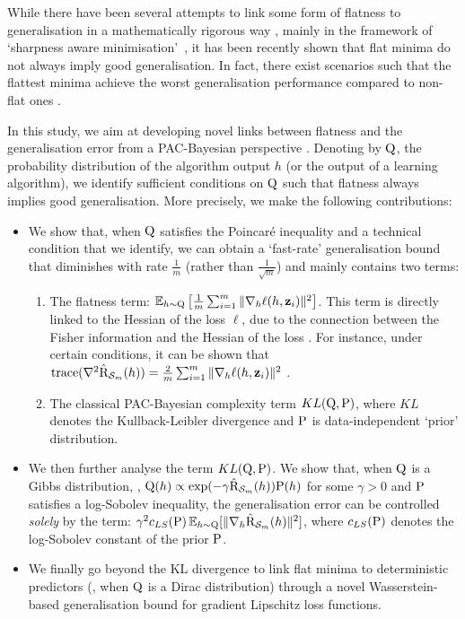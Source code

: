 While there have been several attempts to link some form of flatness to generalisation in a mathematically rigorous way \citep{neyshabur2017explor,petzka2021relative,yue2023sharpness, andriushchenko2023modern}, mainly in the framework of `sharpness aware minimisation'~\citep{foret2020sharpness}, it has been recently shown that flat minima do not always imply good generalisation.
In fact, there exist scenarios such that the flattest minima achieve the worst generalisation performance compared to non-flat ones \citep{wen2023sharpness}. 


In this study, we aim at developing novel links between flatness and the generalisation error from a PAC-Bayesian perspective \citep[see \eg, ][]{guedj2019primer,hellstrom2023generalization,alquier2024user}.
Denoting by $\Q$, the probability distribution of the algorithm output $h$ (or the output of a learning algorithm), we identify sufficient conditions on $\Q$ such that flatness always implies good generalisation.
More precisely, we make the following contributions:
\begin{itemize}
    \item We show that, when $\Q$ satisfies the Poincaré inequality and a technical condition that we identify, we can obtain a `fast-rate' generalisation bound that diminishes with rate $\frac{1}{m}$ (rather than $\frac{1}{\sqrt{m}}$) and mainly contains two terms:  
    \begin{enumerate}[label=(\roman*)]
        \item The flatness term: $ \EE_{h\sim \Q}\LB \frac{1}{m}\sum_{i=1}^m \|\nabla_h\ell(h,\z_i)\|^2 \RB$.
        This term is directly linked to the Hessian of the loss $\ell$, due to the connection between the Fisher information and the Hessian of the loss \cite{bickel2015mathematical}.
        For instance, under certain conditions, it can be shown that $\mathrm{trace}(\nabla^2 \hat{\Risk}_{\S_m}(h)) = \frac{2}{m}\sum_{i=1}^m \|\nabla_h \ell(h,\z_i)\|^2$ \citep[Lemma 4.1]{wen2023sharpness}.  
        \item The classical PAC-Bayesian complexity term $KL(\Q,\P)$, where $KL$ denotes the Kullback-Leibler divergence and $\P$ is data-independent `prior' distribution. 
    \end{enumerate}
    \item We then further analyse the term $KL(\Q,\P)$.
    We show that, when $\Q$ is a Gibbs distribution, \ie, $\Q(h)\propto \exp(- \gamma \hat{\Risk}_{\S_m}(h)) \P(h)$ for some $\gamma >0$ and $\P$ satisfies a log-Sobolev inequality, the generalisation error can be controlled \emph{solely} by the term: $\gamma^2 c_{LS}(\P)\EE_{h\sim \Q}[ \|\nabla_h \hat{\Risk}_{\S_m}(h) \|^2 ]$, where $c_{LS}(\P)$ denotes the log-Sobolev constant of the prior $\P$. 
    \item We finally go beyond the KL divergence to link flat minima to deterministic predictors (\ie, when $\Q$ is a Dirac distribution) through a novel Wasserstein-based generalisation bound for gradient Lipschitz loss functions. 
\end{itemize}
